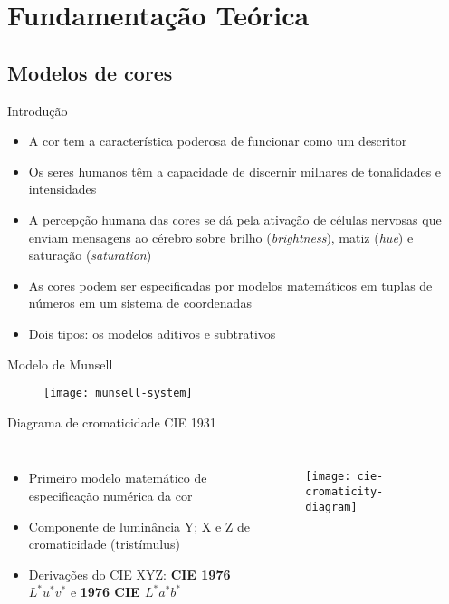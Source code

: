 \section{Fundamentação Teórica}
\subsection{Modelos de cores}

\begin{frame}{Introdução}
\begin{itemize}
    \item A cor tem a característica poderosa de funcionar como um descritor
    \item Os seres humanos têm a capacidade de discernir milhares de tonalidades e intensidades
    \item A percepção humana das cores se dá pela ativação de células nervosas que enviam mensagens ao cérebro sobre brilho (\textit{brightness}), matiz (\textit{hue}) e saturação (\textit{saturation})
    \item As cores podem ser especificadas por modelos matemáticos em tuplas de números em um sistema de coordenadas
    \item Dois tipos: os modelos aditivos e subtrativos
\end{itemize}
\end{frame}

\begin{frame}{Modelo de Munsell}
\begin{figure}[!h]
  \centering
  \texttt{[image: munsell-system]}
\end{figure}
\end{frame}

\begin{frame}{Diagrama de cromaticidade CIE 1931}
\begin{columns}
\begin{itemize}
    \item Primeiro modelo matemático de especificação numérica da cor
    \item Componente de luminância Y; X e Z de cromaticidade (tristímulus)
    \item Derivações do CIE XYZ: \textbf{CIE 1976 $L^*u^*v^*$} e \textbf{1976 CIE $L^*a^*b^*$}
\end{itemize}
\begin{figure}[!h]
  \centering
  \texttt{[image: cie-cromaticity-diagram]}
\end{figure}
\end{columns}
\end{frame}

